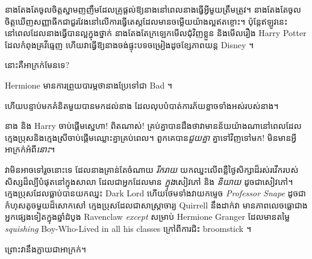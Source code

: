 នាងតែងតែចូលចិត្តស្នាមញញឹមដែលគ្រូផ្តល់ឱ្យនាងនៅពេលនាងធ្វើអ្វីមួយត្រឹមត្រូវ។ នាងតែងតែចូលចិត្តឃើញសញ្ញាធីកជាជួរវែងនៅលើការធ្វើតេស្តដែលមានចម្លើយយ៉ាងល្អឥតខ្ចោះ។ ប៉ុន្តែឥឡូវនេះ នៅពេលដែលនាងធ្វើបានល្អក្នុងថ្នាក់ នាងតែងតែក្រឡេកមើលជុំវិញខ្លួន និងមើលរឿង Harry Potter ដែលកំពុងគ្រវីធ្មេញ ហើយវាធ្វើឱ្យនាងចង់ផ្ទុះបទចម្រៀងដូចខ្សែភាពយន្ត Disney ។

នោះ​គឺ​អាក្រក់​មែន​ទេ?

Hermione មានការព្រួយបារម្ភថានាងប្រែទៅជា Bad ។

ហើយបន្ទាប់មកគំនិតមួយបានមកដល់នាង ដែលលុបបំបាត់ការភ័យខ្លាចទាំងអស់របស់នាង។

នាង និង Harry ចាប់ផ្តើមស្នេហា! ពិតណាស់! គ្រប់​គ្នា​បាន​ដឹង​ថា​វា​មាន​ន័យ​យ៉ាង​ណា​នៅ​ពេល​ដែល​ក្មេង​ប្រុស​និង​ក្មេង​ស្រី​ចាប់​ផ្ដើម​ឈ្លោះ​គ្នា​គ្រប់​ពេល។ ពួក​គេ​បាន​\emph{ជួយ​គ្នា​} គ្នា​ទៅ​វិញ​ទៅ​មក! មិនមានអ្វីអាក្រក់អំពី\emph{នោះ}។

វាមិនអាចទៅរួចនោះទេ ដែលនាងគ្រាន់តែចំណាយ \emph{រីករាយ} យកឈ្នះលើពន្លឺថ្ងៃសិក្សាដ៏រស់រវើករបស់សិស្សដ៏ល្បីបំផុតនៅក្នុងសាលា ដែលជាអ្នកដែលមាន \emph{ក្នុង}សៀវភៅ និង \emph{និយាយ} ដូចជាសៀវភៅ។ ក្មេងប្រុសដែលធ្លាប់បានយកឈ្នះ Dark Lord ហើយថែមទាំងវាយកម្ទេច \emph{Professor Snape} ដូចជាកំហុសតូចមួយដ៏សោកសៅ ក្មេងប្រុសដែលជាសាស្រ្តាចារ្យ Quirrell នឹងដាក់វា មានភាពលេចធ្លោជាងអ្នកផ្សេងទៀតក្នុងឆ្នាំដំបូង Ravenclaw \emph {except} សម្រាប់ Hermione Granger ដែលមានតម្លៃ \emph{squishing} Boy-Who-Lived in all his classes ក្រៅពីការជិះ broomstick ។

ព្រោះវានឹងក្លាយជាអាក្រក់។

